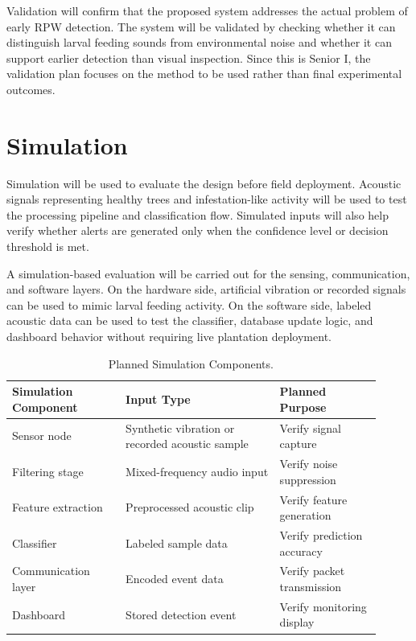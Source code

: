 \documentclass[12pt,a4paper,oneside]{memoir}
\begin{document}
Validation will confirm that the proposed system addresses the actual problem of early RPW detection. The system will be validated by checking whether it can distinguish larval feeding sounds from environmental noise and whether it can support earlier detection than visual inspection. Since this is Senior I, the validation plan focuses on the method to be used rather than final experimental outcomes.

\section{Simulation}
\label{sec:Simulation}

Simulation will be used to evaluate the design before field deployment. Acoustic signals representing healthy trees and infestation-like activity will be used to test the processing pipeline and classification flow. Simulated inputs will also help verify whether alerts are generated only when the confidence level or decision threshold is met.

A simulation-based evaluation will be carried out for the sensing, communication, and software layers. On the hardware side, artificial vibration or recorded signals can be used to mimic larval feeding activity. On the software side, labeled acoustic data can be used to test the classifier, database update logic, and dashboard behavior without requiring live plantation deployment.

\begin{table}[h]
\centering
\caption{Planned Simulation Components.}
\label{tab:simulation}
\renewcommand{\arraystretch}{1.3}
\begin{tabular}{@{} p{0.28\linewidth} p{0.38\linewidth} p{0.25\linewidth} @{}}
\toprule
\textbf{Simulation Component} & \textbf{Input Type} & \textbf{Planned Purpose} \\
\midrule
Sensor node        & Synthetic vibration or recorded acoustic sample & Verify signal capture \\
Filtering stage    & Mixed-frequency audio input                     & Verify noise suppression \\
Feature extraction & Preprocessed acoustic clip                      & Verify feature generation \\
Classifier         & Labeled sample data                             & Verify prediction accuracy \\
Communication layer & Encoded event data                             & Verify packet transmission \\
Dashboard          & Stored detection event                          & Verify monitoring display \\
\bottomrule
\end{tabular}
\end{table}
\end{document}
